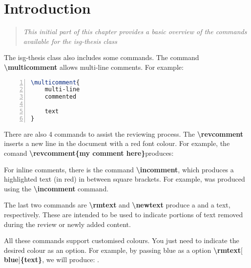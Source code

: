 \chapter{Introduction}\label{chap:introduction}

\minitoc %

\begin{quote}
{\it This initial part of this chapter provides a basic overview of the commands available for the isg-thesis class}
\end{quote}

The isg-thesis class also includes some commands. The command \textbf{\textbackslash{multicomment}} allows multi-line comments. For example:

\begin{lstlisting}[frame=single,
					frameround=tttt,
					rulecolor=\color{black},
					language=TeX,
					basicstyle=\small,
					backgroundcolor=\color{black!10},
					numbers=left,
					numberstyle=\small\color{gray},
					xleftmargin=50pt,
					xrightmargin=50pt,
					framextopmargin=2pt,
					framexrightmargin=3pt,
					framexleftmargin=3pt,
					framexbottommargin=2pt,
				]
\multicomment{
    multi-line
    commented
    
    text
}
\end{lstlisting}

There are also 4 commands to assist the reviewing process. The \textbf{\textbackslash{revcomment}} inserts a new line in the document with a red font colour. For example, the comand \textbf{\textbackslash{revcomment}\{my comment here\}}produces:



For inline comments, there is the command \textbf{\textbackslash{incomment}}, which produces a highlighted text (in red) in between square brackets. For example,  was produced using the \textbf{\textbackslash{incomment}} command.

The last two commands are \textbf{\textbackslash{rmtext}} and \textbf{\textbackslash{newtext}} produce a  and a  text, respectively. These are intended to be used to indicate portions of text removed during the review or newly added content.

All these commands support customised colours. You just need to indicate the desired colour as an option. For example, by passing blue as a option \textbf{\textbackslash{rmtext}$[$blue$]$\{text\}}, we will produce: .


